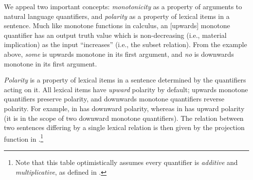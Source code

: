 We appeal two important concepts: \textit{monotonicity} as a
  property of arguments to natural language quantifiers,
  and \textit{polarity}
  as a property of lexical items in a sentence.
Much like monotone functions in calculus,
  an [upwards] monotone quantifier has an output truth value which is
  non-decreasing (i.e., material implication)
  as the input ``increases'' (i.e., the subset relation).
From the example above, \textit{some} is upwards monotone in its first
  argument, and \textit{no} is downwards monotone in its first argument.

%

\textit{Polarity} is
  a property of lexical items in a sentence determined by the
  quantifiers acting on it.
All lexical items have \textit{upward} polarity by default;
  upwards monotone quantifiers preserve polarity,
  and downwards monotone quantifiers reverse polarity.
For example,  in  has downward polarity,
  whereas
   in  has upward polarity
  (it is in the scope of two downward monotone quantifiers).
The relation between two sentences differing by a single lexical
  relation is then given by the projection function in
  .\footnote{
    Note that this table optimistically assumes every quantifier is
    \textit{additive} and \textit{multiplicative}, as defined
    in .
  }

